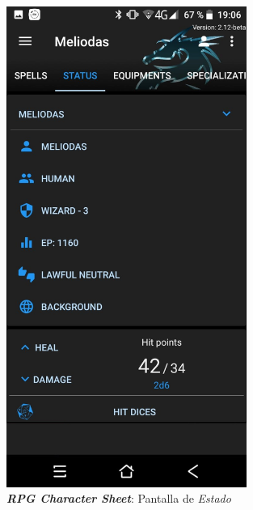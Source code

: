 \begin{figure}[H]
    \centering
    \begin{minipage}{0.3\textwidth}
        \centering
        \includegraphics[width=0.7\textwidth]{Images/RPG_Character_Sheet_1.jpeg}
        \caption{\textit{\textbf{RPG Character Sheet}}: Pantalla de \textit{Estado}}
        

\end{minipage}
\end{figure}
